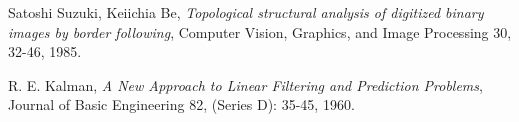 \begin{thebibliography}{9}

	Satoshi Suzuki, Keiichia Be,
	\emph{Topological structural analysis of digitized binary images by border following},
	Computer Vision, Graphics, and Image Processing 30, 32-46,
	1985.
	
	R. E. Kalman,
	\emph{A New Approach to Linear Filtering and Prediction Problems},
	Journal of Basic Engineering 82, (Series D): 35-45,
	1960.

\end{thebibliography}